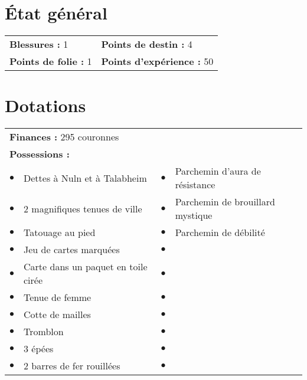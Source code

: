 \documentclass{scrartcl}
\begin{document}
\section*{{\'E}tat général}

\begin{tabular}{X{\arrlenZ} X{\arrlenZ}}
\textbf{Blessures :} 1 & \textbf{Points de destin :} 4 \\
\textbf{Points de folie :} 1 & \textbf{Points d'expérience :} 50 \\
\end{tabular}

\section*{Dotations}

\begin{tabular}{cX{\arrlenZ} cX{\arrlenZ}}
\multicolumn{4}{l}{\textbf{Finances :} 295 couronnes} \\
\multicolumn{4}{l}{\textbf{Possessions :}} \\
$\bullet$ & Dettes à Nuln et à Talabheim & $\bullet$ & Parchemin d'aura de résistance \\
$\bullet$ & 2 magnifiques tenues de ville & $\bullet$ & Parchemin de brouillard mystique \\
$\bullet$ & Tatouage au pied & $\bullet$ & Parchemin de débilité \\
$\bullet$ & Jeu de cartes marquées & $\bullet$ & \\
$\bullet$ & Carte dans un paquet en toile cirée & $\bullet$ & \\
$\bullet$ & Tenue de femme & $\bullet$ & \\
$\bullet$ & Cotte de mailles & $\bullet$ & \\
$\bullet$ & Tromblon & $\bullet$ & \\
$\bullet$ & 3 épées & $\bullet$ & \\
$\bullet$ & 2 barres de fer rouillées & $\bullet$ & \\
\end{tabular}
\end{document}
